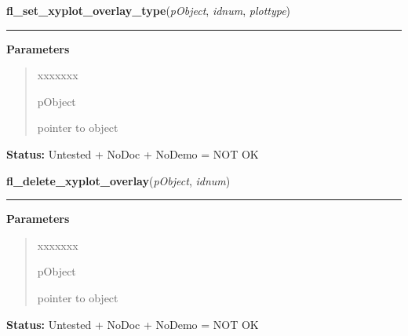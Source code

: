 \hspace{.8\funcindent}\begin{boxedminipage}{\funcwidth}

    \raggedright \textbf{fl\_set\_xyplot\_overlay\_type}(\textit{pObject}, \textit{idnum}, \textit{plottype})

    \vspace{-1.5ex}

    \rule{\textwidth}{0.5\fboxrule}
\setlength{\parskip}{2ex}
\setlength{\parskip}{1ex}
      \textbf{Parameters}
      \vspace{-1ex}

      \begin{quote}
        \begin{Ventry}{xxxxxxx}

          \item[pObject]

          pointer to object

        \end{Ventry}

      \end{quote}

\textbf{Status:} Untested + NoDoc + NoDemo = NOT OK



    \end{boxedminipage}

    \label{xformslib:library:fl_delete_xyplot_overlay}

    \vspace{0.5ex}

\hspace{.8\funcindent}\begin{boxedminipage}{\funcwidth}

    \raggedright \textbf{fl\_delete\_xyplot\_overlay}(\textit{pObject}, \textit{idnum})

    \vspace{-1.5ex}

    \rule{\textwidth}{0.5\fboxrule}
\setlength{\parskip}{2ex}
\setlength{\parskip}{1ex}
      \textbf{Parameters}
      \vspace{-1ex}

      \begin{quote}
        \begin{Ventry}{xxxxxxx}

          \item[pObject]

          pointer to object

        \end{Ventry}

      \end{quote}

\textbf{Status:} Untested + NoDoc + NoDemo = NOT OK



    \end{boxedminipage}

